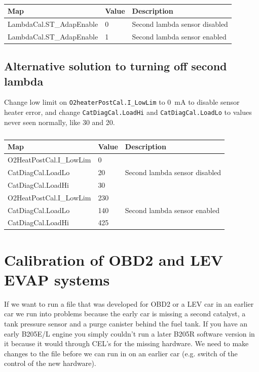 \documentclass[11pt,a4paper]{book}
\begin{document}
\begin{table}
    \centering
    \begin{tabular}{lll}
        Map & Value& Description \\
        \midrule
        LambdaCal.ST\_AdapEnable & 0 &Second lambda sensor disabled \\
        LambdaCal.ST\_AdapEnable & 1& Second lambda sensor enabled \\
    \end{tabular}
    \caption{}
    \label{tab:}
\end{table}

\subsection{Alternative solution to turning off second lambda}
Change low limit on \texttt{O2heaterPostCal.I\_LowLim} to \SI{0}{\milli\ampere}
to disable sensor heater error, and change \texttt{CatDiagCal.LoadHi} and
\texttt{CatDiagCal.LoadLo} to values never seen normally, like 30 and 20.

\begin{table}
    \centering
    \begin{tabular}{lll}
        Map & Value & Description \\
        \midrule
        O2HeatPostCal.I\_LowLim& 0& \multirow{3}{*}{Second lambda sensor disabled} \\
        CatDiagCal.LoadLo &20 &\\
        CatDiagCal.LoadHi &30&\\
        O2HeatPostCal.I\_LowLim & 230 & \multirow{3}{*}{Second lambda sensor enabled}\\
        CatDiagCal.LoadLo &140 &\\
        CatDiagCal.LoadHi &425 &\\
    \end{tabular}
    \caption{}
    \label{tab:}
\end{table}

\section{Calibration of OBD2 and LEV EVAP systems}
If we want to run a file that was developed for OBD2 or a LEV car in an earlier
car we run into problems because the early car is missing a second catalyst, a
tank pressure sensor and a purge canister behind the fuel tank. If you have an
early B205E/L engine you simply couldn’t run a later B205R software version in
it because it would through CEL’s for the missing hardware. We need to make
changes to the file before we can run in on an earlier car (e.g. switch of the
    control of the new hardware).
\end{document}
